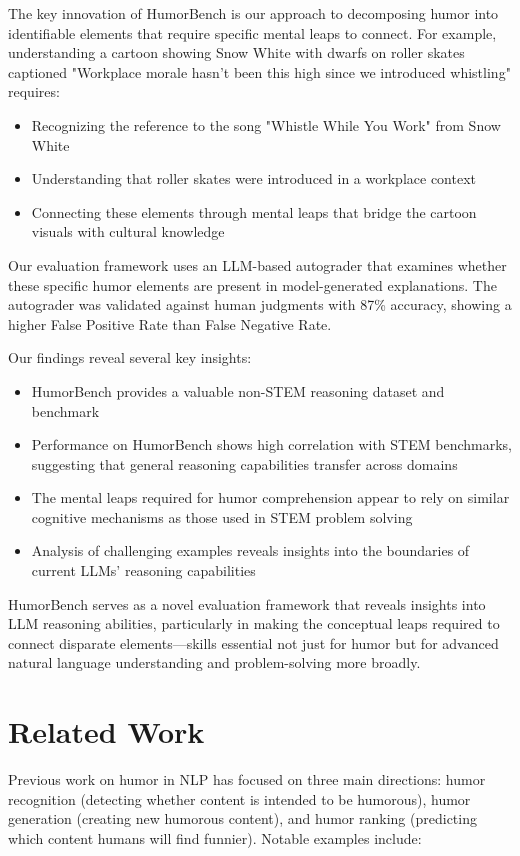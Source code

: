 \documentclass[twocolumn]{article}
\begin{document}
The key innovation of HumorBench is our approach to decomposing humor into identifiable elements that require specific mental leaps to connect. For example, understanding a cartoon showing Snow White with dwarfs on roller skates captioned "Workplace morale hasn't been this high since we introduced whistling" requires:
\begin{itemize}
    \item Recognizing the reference to the song "Whistle While You Work" from Snow White
    \item Understanding that roller skates were introduced in a workplace context
    \item Connecting these elements through mental leaps that bridge the cartoon visuals with cultural knowledge
\end{itemize}

Our evaluation framework uses an LLM-based autograder that examines whether these specific humor elements are present in model-generated explanations. The autograder was validated against human judgments with 87\% accuracy, showing a higher False Positive Rate than False Negative Rate.

Our findings reveal several key insights:
\begin{itemize}
    \item HumorBench provides a valuable non-STEM reasoning dataset and benchmark
    \item Performance on HumorBench shows high correlation with STEM benchmarks, suggesting that general reasoning capabilities transfer across domains
    \item The mental leaps required for humor comprehension appear to rely on similar cognitive mechanisms as those used in STEM problem solving
    \item Analysis of challenging examples reveals insights into the boundaries of current LLMs' reasoning capabilities
\end{itemize}

HumorBench serves as a novel evaluation framework that reveals insights into LLM reasoning abilities, particularly in making the conceptual leaps required to connect disparate elements—skills essential not just for humor but for advanced natural language understanding and problem-solving more broadly.

\section{Related Work}
Previous work on humor in NLP has focused on three main directions: humor recognition (detecting whether content is intended to be humorous), humor generation (creating new humorous content), and humor ranking (predicting which content humans will find funnier). Notable examples include:
\end{document}

